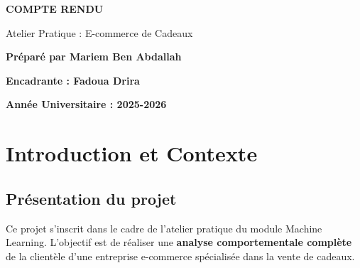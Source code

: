 \documentclass[11pt,a4paper]{article}
\begin{document}
\begin{titlepage}

\vspace{6cm}

\begin{center}
{\LARGE\textbf{COMPTE RENDU}}\par
\vspace{1cm}
{\large Atelier Pratique : E-commerce de Cadeaux}\par
\vspace{2cm}
{\large \textbf{Préparé par Mariem Ben Abdallah}}
\vspace{3cm}


\vspace{2cm}

{\large \textbf{Encadrante : Fadoua Drira}}

\vspace{5cm}

{\textbf{Année Universitaire : 2025-2026}}

\end{center}
\vfill
\end{titlepage}

\tableofcontents
\newpage

\section{Introduction et Contexte}

\subsection{Présentation du projet}
Ce projet s'inscrit dans le cadre de l'atelier pratique du module Machine Learning. 
L'objectif est de réaliser une \textbf{analyse comportementale complète} de la clientèle 
d'une entreprise e-commerce spécialisée dans la vente de cadeaux.
\end{document}
